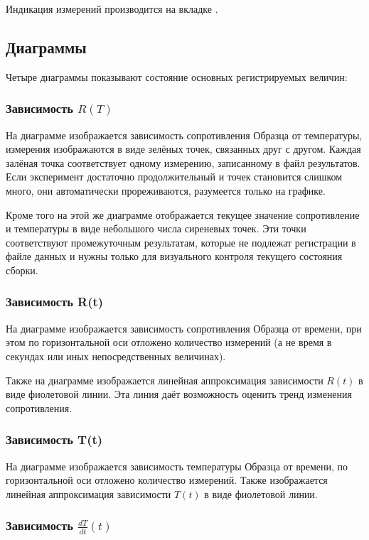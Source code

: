 \documentclass[12pt, a4paper, twocolumn]{report}
\begin{document}
Индикация измерений производится на вкладке .

\subsection{Диаграммы}

Четыре диаграммы показывают состояние основных регистрируемых величин:

\subsubsection{Зависимость $R(T)$}

На диаграмме изображается зависимость сопротивления Образца от температуры, измерения изображаются в виде зелёных точек, связанных друг с другом. Каждая залёная точка соответствует одному измерению, записанному в файл результатов. Если эксперимент достаточно продолжительный и точек становится слишком много, они автоматически прореживаются, разумеется только на графике.

Кроме того на этой же диаграмме отображается текущее значение сопротивление и температуры в виде небольшого числа сиреневых точек. Эти точки соответствуют промежуточным результатам, которые не подлежат регистрации в файле данных и нужны только для визуального контроля текущего состояния сборки.

\subsubsection{Зависимость R(t)}

На диаграмме изображается зависимость сопротивления Образца от времени, при этом по горизонтальной оси отложено количество измерений (а не время в секундах или иных непосредственных величинах).

Также на диаграмме изображается линейная аппроксимация зависимости $R(t)$ в виде фиолетовой линии. Эта линия даёт возможность оценить тренд изменения сопротивления.

\subsubsection{Зависимость T(t)}

На диаграмме изображается зависимость температуры Образца от времени, по горизонтальной оси отложено количество измерений. Также изображается линейная аппроксимация зависимости $T(t)$ в виде фиолетовой линии.

\subsubsection{Зависимость $\frac{dT}{dt}(t)$}
\end{document}
